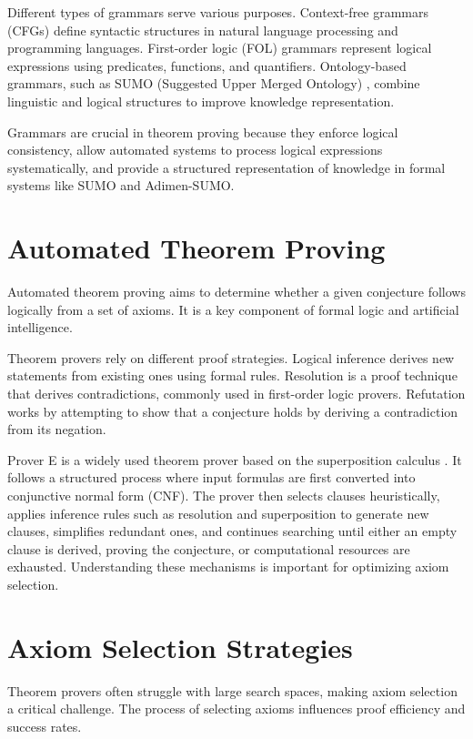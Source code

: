 \documentclass[english,version-2020-11]{uzl-thesis}
\begin{document}
Different types of grammars serve various purposes. Context-free grammars (CFGs) define syntactic structures in natural language processing and programming languages. First-order logic (FOL) grammars represent logical expressions using predicates, functions, and quantifiers. Ontology-based grammars, such as SUMO (Suggested Upper Merged Ontology) \cite{Niles2001}, combine linguistic and logical structures to improve knowledge representation.

Grammars are crucial in theorem proving because they enforce logical consistency, allow automated systems to process logical expressions systematically, and provide a structured representation of knowledge in formal systems like SUMO and Adimen-SUMO.

\section{Automated Theorem Proving}

Automated theorem proving aims to determine whether a given conjecture follows logically from a set of axioms. It is a key component of formal logic and artificial intelligence.

Theorem provers rely on different proof strategies. Logical inference derives new statements from existing ones using formal rules. Resolution is a proof technique that derives contradictions, commonly used in first-order logic provers. Refutation works by attempting to show that a conjecture holds by deriving a contradiction from its negation.

Prover E is a widely used theorem prover based on the superposition calculus \cite{Schulz2019}. It follows a structured process where input formulas are first converted into conjunctive normal form (CNF). The prover then selects clauses heuristically, applies inference rules such as resolution and superposition to generate new clauses, simplifies redundant ones, and continues searching until either an empty clause is derived, proving the conjecture, or computational resources are exhausted. Understanding these mechanisms is important for optimizing axiom selection.

\section{Axiom Selection Strategies}

Theorem provers often struggle with large search spaces, making axiom selection a critical challenge. The process of selecting axioms influences proof efficiency and success rates.
\end{document}
